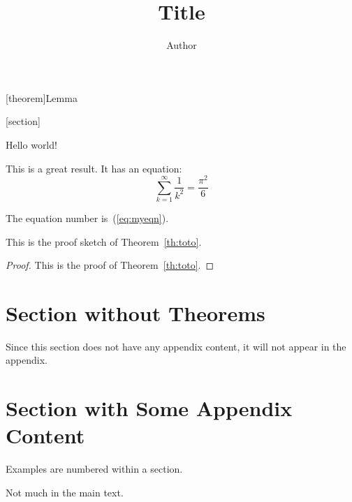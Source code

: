 \usepackage{hyperref}

\theoremstyle{plain}

[theorem]{Lemma}

[section]

\renewcommand{\appendixsectionformat}[2]{Material for #2 (Section~#1)}
\renewcommand{\appendixrefname}{Appendix References}

\title{Title}
\author{Author}



\maketitle

Hello world!

\begin{theoremrep}
  \label{th:toto}
  This is a great result. It has an equation:
  \begin{equation}
    \label{eq:myeqn}
    \sum_{k=1}^\infty \frac1{k^2}=\frac{\pi^2}6
 \end{equation}
\end{theoremrep}

The equation number is~(\ref{eq:myeqn}).

\begin{proofsketch}
  This is the proof sketch of Theorem~\ref{th:toto}.
\end{proofsketch}

\begin{proof}
  This is the proof of Theorem~\ref{th:toto}.
\end{proof}

\section{Section without Theorems}

Since this section does not have any appendix content, it will not appear in the
appendix. \cite{brin1998anatomy}

\section{Section with Some Appendix Content}

\begin{example}
  Examples are numbered within a section.
\end{example}

Not much in the main text.

